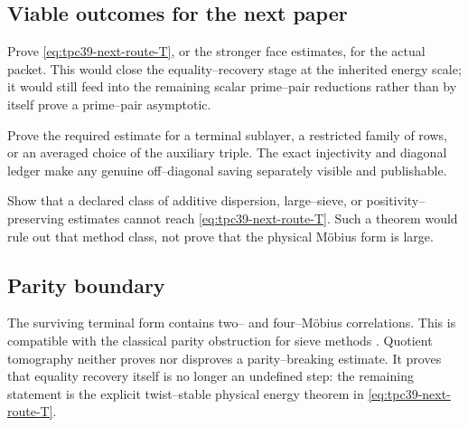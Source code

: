 \subsection{Viable outcomes for the next paper}

\begin{description}[style=nextline,leftmargin=1.8em]
 \item[Positive twist--stable theorem.]
 Prove \eqref{eq:tpc39-next-route-T}, or the stronger face estimates, for
 the actual packet.  This would close the equality--recovery stage at the
 inherited energy scale; it would still feed into the remaining scalar
 prime--pair reductions rather than by itself prove a prime--pair
 asymptotic.

 \item[Partial arithmetic theorem.]
 Prove the required estimate for a terminal sublayer, a restricted family
 of rows, or an averaged choice of the auxiliary triple.  The exact
 injectivity and diagonal ledger make any genuine off--diagonal saving
 separately visible and publishable.

 \item[Scoped twist obstruction.]
 Show that a declared class of additive dispersion, large--sieve, or
 positivity--preserving estimates cannot reach
 \eqref{eq:tpc39-next-route-T}.  Such a theorem would rule out that method
 class, not prove that the physical M\"obius form is large.
\end{description}

\subsection{Parity boundary}

The surviving terminal form contains two-- and four--M\"obius
correlations.  This is compatible with the classical parity obstruction
for sieve methods \citep{HeathBrown1982Parity,IwaniecKowalski2004}.
Quotient tomography neither proves nor disproves a parity--breaking
estimate.  It proves that equality recovery itself is no longer an
undefined step: the remaining statement is the explicit twist--stable
physical energy theorem in \eqref{eq:tpc39-next-route-T}.
